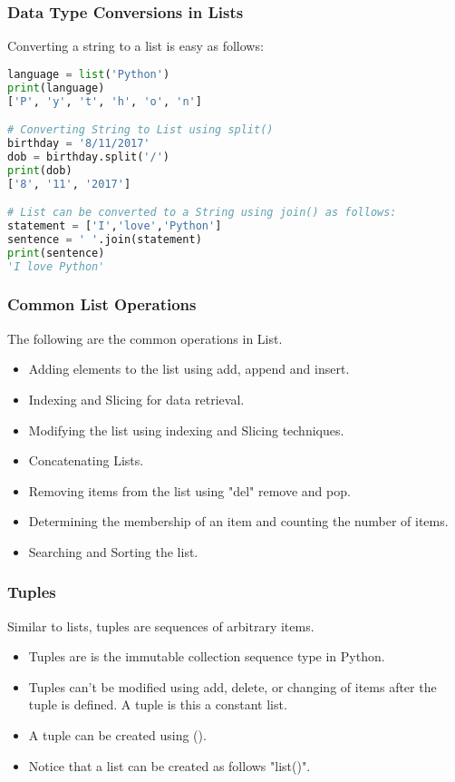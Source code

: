 \documentclass{beamer}
\begin{document}
\begin{frame}[fragile]
\frametitle{Data Type Conversions in Lists}
Converting a string to a list is easy as follows:
\begin{lstlisting}[language=Python]
language = list('Python')
print(language)
['P', 'y', 't', 'h', 'o', 'n']

# Converting String to List using split()
birthday = '8/11/2017'
dob = birthday.split('/')
print(dob)
['8', '11', '2017']

# List can be converted to a String using join() as follows:
statement = ['I','love','Python']
sentence = ' '.join(statement)
print(sentence)
'I love Python'
\end{lstlisting}
\end{frame}

\begin{frame}
\frametitle{Common List Operations}
The following are the common operations in List.
\begin{itemize}
\item Adding elements to the list using add, append and insert.
\item Indexing and Slicing for data retrieval.
\item Modifying the list using indexing and Slicing techniques.
\item Concatenating Lists.
\item Removing items from the list using "del" remove and pop.
\item Determining the membership of an item and counting the number of items.
\item Searching and Sorting the list.

\end{itemize}
\end{frame}

\begin{frame}
\frametitle{Tuples}
Similar to lists, tuples are sequences of arbitrary items. 
\begin{itemize}
\item Tuples are is the immutable collection sequence type in Python.
\item Tuples can’t be modified using add, delete, or changing of items after the tuple is defined. A tuple is this a constant list.
\item A tuple can be created using ().
\item Notice that a list can be created as follows "list()".
\end{itemize}
\end{frame}
\end{document}
